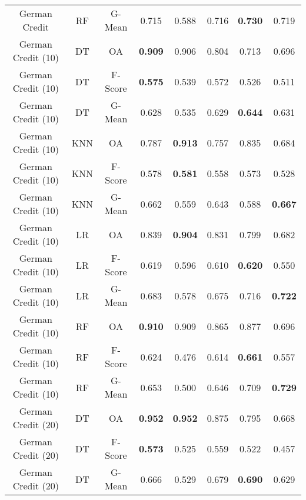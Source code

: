 \begin{longtable}{cccccccc}
     German Credit &         RF &  G-Mean &          0.715 &          0.588 &          0.716 & \textbf{0.730} &          0.719 \\
German Credit (10) &         DT &      OA & \textbf{0.909} &          0.906 &          0.804 &          0.713 &          0.696 \\
German Credit (10) &         DT & F-Score & \textbf{0.575} &          0.539 &          0.572 &          0.526 &          0.511 \\
German Credit (10) &         DT &  G-Mean &          0.628 &          0.535 &          0.629 & \textbf{0.644} &          0.631 \\
German Credit (10) &        KNN &      OA &          0.787 & \textbf{0.913} &          0.757 &          0.835 &          0.684 \\
German Credit (10) &        KNN & F-Score &          0.578 & \textbf{0.581} &          0.558 &          0.573 &          0.528 \\
German Credit (10) &        KNN &  G-Mean &          0.662 &          0.559 &          0.643 &          0.588 & \textbf{0.667} \\
German Credit (10) &         LR &      OA &          0.839 & \textbf{0.904} &          0.831 &          0.799 &          0.682 \\
German Credit (10) &         LR & F-Score &          0.619 &          0.596 &          0.610 & \textbf{0.620} &          0.550 \\
German Credit (10) &         LR &  G-Mean &          0.683 &          0.578 &          0.675 &          0.716 & \textbf{0.722} \\
German Credit (10) &         RF &      OA & \textbf{0.910} &          0.909 &          0.865 &          0.877 &          0.696 \\
German Credit (10) &         RF & F-Score &          0.624 &          0.476 &          0.614 & \textbf{0.661} &          0.557 \\
German Credit (10) &         RF &  G-Mean &          0.653 &          0.500 &          0.646 &          0.709 & \textbf{0.729} \\
German Credit (20) &         DT &      OA & \textbf{0.952} & \textbf{0.952} &          0.875 &          0.795 &          0.668 \\
German Credit (20) &         DT & F-Score & \textbf{0.573} &          0.525 &          0.559 &          0.522 &          0.457 \\
German Credit (20) &         DT &  G-Mean &          0.666 &          0.529 &          0.679 & \textbf{0.690} &          0.629 \\

\end{longtable}

